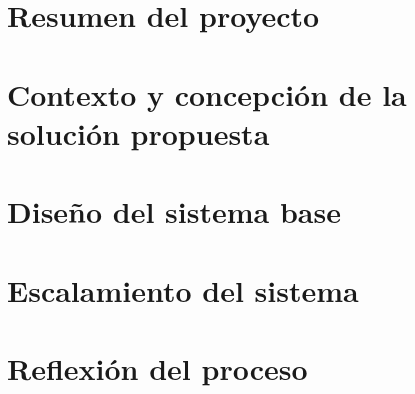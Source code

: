 \documentclass{report}
\begin{document}


\tableofcontents
\newpage

\pagestyle{fancy}
\fancyhead{}\fancyfoot{}
\fancyfoot[C]{\thepage}

\chapter{Resumen del proyecto}

\newpage

\chapter{Contexto y concepción de la solución propuesta}

\newpage

\chapter{Diseño del sistema base}

\newpage

\chapter{Escalamiento del sistema}

\newpage

    \chapter{Reflexión del proceso}
    
    \newpage
\end{document}
